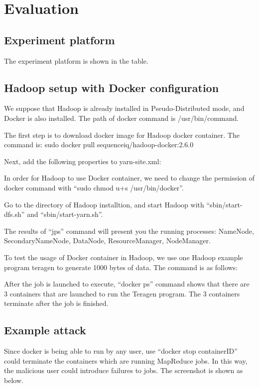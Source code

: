 \section{Evaluation}
\label{sec:eval}

\iffalse
Evaluation (don't forget to interpret your data)
\fi

\subsection{Experiment platform}

The experiment platform is shown in the table.

\subsection{Hadoop setup with Docker configuration}

We suppose that Hadoop is already installed in Pseudo-Distributed mode, and Docker is also installed. The path of docker command is /usr/bin/command.

The first step is to download docker image for Hadoop docker container. The command is: sudo docker pull sequenceiq/hadoop-docker:2.6.0

Next, add the following properties to yarn-site.xml:



In order for Hadoop to use Docker container, we need to change the permission of docker command with “sudo chmod u+s /usr/bin/docker”.

Go to the directory of Hadoop installtion, and start Hadoop with “sbin/start-dfs.sh” and “sbin/start-yarn.sh”. 

The results of  “jps” command will present you the running processes: NameNode, SecondaryNameNode, DataNode, ResourceManager, NodeManager.

To test the usage of Docker container in Hadoop, we use one Hadoop example program teragen to generate 1000 bytes of data. The command is as follows:

\iffalse
bin/hadoop jar share/hadoop/mapreduce/hadoop-mapreduce-examples-2.6.0.jar teragen -Dmapreduce.map.env="yarn.nodemanager.docker-container-executor.image-name=sequenceiq/hadoop-docker:2.6.0" -Dyarn.app.mapreduce.am.env="yarn.nodemanager.docker-container-executor.image-name=sequenceiq/hadoop-docker:2.6.0" 1000 teragen_out_dir
\fi

After the job is launched to execute, “docker ps” command shows that there are 3 containers that are launched to run the Teragen program. The 3 containers terminate after the job is finished.

\subsection{Example attack}

Since docker is being able to run by any user, use “docker stop containerID” could terminate the containers which are running MapReduce jobs. In this way, the malicious user could introduce failures to jobs. The screenshot is shown as below.